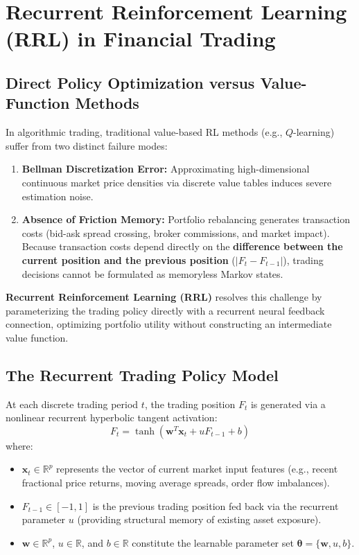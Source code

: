 \section{Recurrent Reinforcement Learning (RRL) in Financial Trading}

\subsection{Direct Policy Optimization versus Value-Function Methods}
In algorithmic trading, traditional value-based RL methods (e.g., $Q$-learning) suffer from two distinct failure modes:
\begin{enumerate}
    \item \textbf{Bellman Discretization Error:} Approximating high-dimensional continuous market price densities via discrete value tables induces severe estimation noise.
    \item \textbf{Absence of Friction Memory:} Portfolio rebalancing generates transaction costs (bid-ask spread crossing, broker commissions, and market impact). Because transaction costs depend directly on the \textbf{difference between the current position and the previous position} ($|F_t - F_{t-1}|$), trading decisions cannot be formulated as memoryless Markov states.
\end{enumerate}

\textbf{Recurrent Reinforcement Learning (RRL)} resolves this challenge by parameterizing the trading policy directly with a recurrent neural feedback connection, optimizing portfolio utility without constructing an intermediate value function.

\subsection{The Recurrent Trading Policy Model}
At each discrete trading period $t$, the trading position $F_t$ is generated via a nonlinear recurrent hyperbolic tangent activation:
\begin{equation}
    F_t = \tanh(\mathbf{w}^T \mathbf{x}_t + u F_{t-1} + b)
\end{equation}
where:
\begin{itemize}
    \item $\mathbf{x}_t \in \mathbb{R}^p$ represents the vector of current market input features (e.g., recent fractional price returns, moving average spreads, order flow imbalances).
    \item $F_{t-1} \in [-1, 1]$ is the previous trading position fed back via the recurrent parameter $u$ (providing structural memory of existing asset exposure).
    \item $\mathbf{w} \in \mathbb{R}^p$, $u \in \mathbb{R}$, and $b \in \mathbb{R}$ constitute the learnable parameter set $\boldsymbol{\theta} = \{\mathbf{w}, u, b\}$.
\end{itemize}

